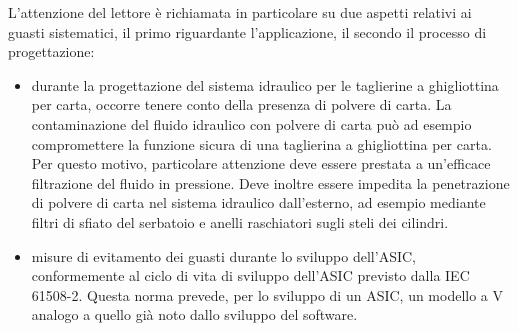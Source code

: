 L'attenzione del lettore è richiamata in particolare su due aspetti relativi ai guasti sistematici, il primo riguardante l'applicazione, il secondo il processo di progettazione:
\begin{itemize}
    \item durante la progettazione del sistema idraulico per le taglierine a ghigliottina per carta, occorre tenere conto della presenza di polvere di carta. La contaminazione del fluido idraulico con polvere di carta può ad esempio compromettere la funzione sicura di una taglierina a ghigliottina per carta. Per questo motivo, particolare attenzione deve essere prestata a un'efficace filtrazione del fluido in pressione. Deve inoltre essere impedita la penetrazione di polvere di carta nel sistema idraulico dall'esterno, ad esempio mediante filtri di sfiato del serbatoio e anelli raschiatori sugli steli dei cilindri.
    \item misure di evitamento dei guasti durante lo sviluppo dell'ASIC, conformemente al ciclo di vita di sviluppo dell'ASIC previsto dalla IEC 61508-2. Questa norma prevede, per lo sviluppo di un ASIC, un modello a V analogo a quello già noto dallo sviluppo del software.
\end{itemize}

